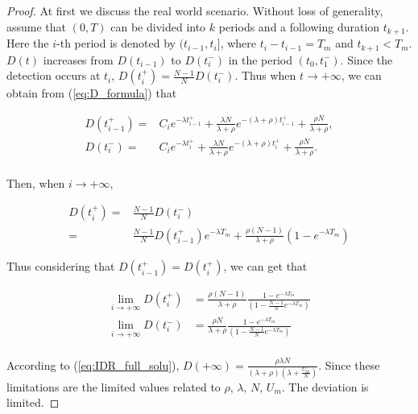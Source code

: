 \begin{proof}
At first we discuss the real world scenario.
Without loss of generality,
assume that $(0, T)$ can be divided into $k$ periods 
and a following duration $t_{k+1}$.
Here the $i$-th period is denoted by $(t_{i-1}, t_{i}]$,
where $t_{i} - t_{i-1} = T_{m}$ and $t_{k+1} < T_{m}$.
$D(t)$ increases from $D(t_{i-1})$ to $D(t_{i}^{-})$ 
in the period $(t_{0}, t_{1}^{-})$.
Since the detection occurs at $t_{i}$, 
$D(t_{i}^{+}) = \frac{N-1}{N}D(t_{i}^{-})$.
Thus when $t \rightarrow +\infty$,
we can obtain from (\ref{eq:D_formula}) that
\begin{small}
\begin{equation}
\nonumber
\begin{aligned}
D(t_{i-1}^{+}) = & C_{i} e^{-\lambda t_{i-1}^{+}} 
+ \frac{\lambda N}{\lambda + \rho} e^{-(\lambda+\rho)t_{i-1}^{+}}
+ \frac{\rho N}{\lambda+\rho}, \\
D(t_{i}^{-}) = & C_{i} e^{-\lambda t_{i}^{+}}
+ \frac{\lambda N}{\lambda + \rho} e^{-(\lambda+\rho)t_{i}^{+}}
+ \frac{\rho N}{\lambda+\rho}. \\
\end{aligned}
\end{equation}
\end{small}
Then, when $i \rightarrow +\infty$,
\begin{small}
\begin{equation}
\nonumber
\begin{aligned}
D(t_{i}^{+}) =& \frac{N-1}{N} D(t_{i}^{-}) \\
=& \frac{N-1}{N} D(t_{i-1}^{+}) e^{-\lambda T_{m}}
+ \frac{\rho (N-1)}{\lambda + \rho} (1 - e^{-\lambda T_{m}})
\end{aligned}
\end{equation}
\end{small}
Thus considering that $D(t_{i-1}^{+}) = D(t_{i}^{+})$, we can get that
\begin{small}
\begin{equation}
\nonumber
\begin{aligned}
\lim_{i \rightarrow +\infty} D(t_{i}^{+}) &=
\frac{\rho(N-1)}{\lambda+\rho} \frac{1 - e^{-\lambda T_{m}}}
{(1 - \frac{N-1}{N}e^{-\lambda T_{m}})} \\
\lim_{i \rightarrow +\infty} D(t_{i}^{-}) &=
\frac{\rho N}{\lambda+\rho} \frac{1 - e^{-\lambda T_{m}}}
{(1 - \frac{N-1}{N}e^{-\lambda T_{m}})} \\
\end{aligned}
\end{equation}
\end{small}
According to (\ref{eq:IDR_full_solu}),
$D(+\infty) = \frac{\rho \lambda N}
{(\lambda + \rho)(\lambda + \frac{U_{m}}{N})}$.
Since these limitations are the limited values related to 
$\rho$, $\lambda$, $N$, $U_{m}$.
The deviation is limited. 
\end{proof}

